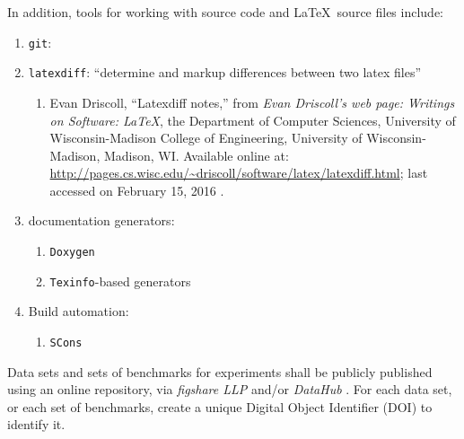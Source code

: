 \documentclass[letter,12pt]{article}
\begin{document}
In addition, tools for working with source code and \LaTeX\ source files include: \vspace{-0.3cm}
\begin{enumerate} \itemsep -4pt
\item {\tt git}: \cite{Driscoll2012}
\item {\tt latexdiff}: ``determine and markup differences between two latex files'' \vspace{-0.3cm}
	\begin{enumerate} \itemsep -2pt
	\item Evan Driscoll, ``Latexdiff notes,'' from {\it Evan Driscoll's web page: Writings on Software: \LaTeX}, the Department of Computer Sciences, University of Wisconsin-Madison College of Engineering, University of Wisconsin-Madison, Madison, WI. Available online at: \url{http://pages.cs.wisc.edu/~driscoll/software/latex/latexdiff.html}; last accessed on February 15, 2016 \cite{Driscoll20XYb}.
	\end{enumerate}
\item documentation generators: \vspace{-0.3cm}
	\begin{enumerate} \itemsep -2pt
	\item {\tt Doxygen} \cite{vanHeesch2016}
	\item {\tt Texinfo}-based generators \cite{WikipediaContributors2016h,Stallman2016,Stallman2016a,Stallman2016b}
	\end{enumerate}
\item Build automation: \vspace{-0.3cm}
	\begin{enumerate} \itemsep -2pt
	\item {\tt SCons} \cite{Driscoll20XY}
	\end{enumerate}
\end{enumerate}


Data sets and sets of benchmarks for experiments shall be publicly published using an online repository, via {\it figshare LLP} \cite{figshareLLPstaff2016} and/or {\it DataHub} \cite{DatopianAtomaticLtdIncStaff2017}. For each data set, or each set of benchmarks, create a unique Digital Object Identifier (DOI) \cite{InternationalDOIFoundationStaff2017} to identify it. \\
\end{document}
